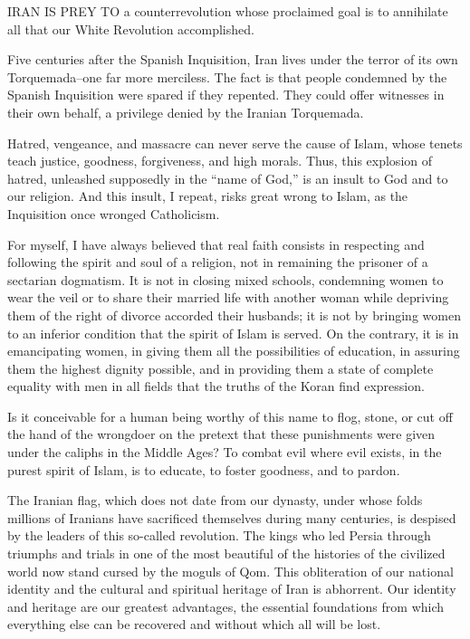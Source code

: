 IRAN IS PREY TO a counterrevolution whose proclaimed goal is to annihilate all that our White Revolution accomplished. 

Five centuries after the Spanish Inquisition, Iran lives under the terror of its own Torquemada--one far more merciless. The fact is that people condemned by the Spanish Inquisition were spared if they repented. They could offer witnesses in their own behalf, a privilege denied by the Iranian Torquemada. 

Hatred, vengeance, and massacre can never serve the cause of Islam, whose tenets teach justice, goodness, forgiveness, and high morals. Thus, this explosion of hatred, unleashed supposedly in the “name of God,” is an insult to God and to our religion. And this insult, I repeat, risks great wrong to Islam, as the Inquisition once wronged Catholicism. 

For myself, I have always believed that real faith consists in respecting and following the spirit and soul of a religion, not in remaining the prisoner of a sectarian dogmatism. It is not in closing mixed schools, condemning women to wear the veil or to share their married life with another woman while depriving them of the right of divorce accorded their husbands; it is not by bringing women to an inferior condition that the spirit of Islam is served. On the contrary, it is in emancipating women, in giving them all the possibilities of education, in assuring them the highest dignity possible, and in providing them a state of complete equality with men in all fields that the truths of the Koran find expression. 

Is it conceivable for a human being worthy of this name to flog, stone, or cut off the hand of the wrongdoer on the pretext that these punishments were given under the caliphs in the Middle Ages? To combat evil where evil exists, in the purest spirit of Islam, is to educate, to foster goodness, and to pardon. 

The Iranian flag, which does not date from our dynasty, under whose folds millions of Iranians have sacrificed themselves during many centuries, is despised by the leaders of this so-called revolution. The kings who led Persia through triumphs and trials in one of the most beautiful of the histories of the civilized world now stand cursed by the moguls of Qom. This obliteration of our national identity and the cultural and spiritual heritage of Iran is abhorrent. Our identity and heritage are our greatest advantages, the essential foundations from which everything else can be recovered and without which all will be lost. 

